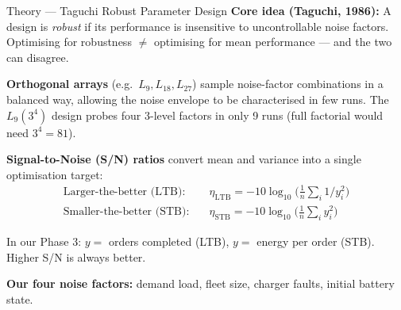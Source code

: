 \documentclass[aspectratio=169,10pt]{beamer}
\begin{document}
\begin{frame}{Theory --- Taguchi Robust Parameter Design}
  \footnotesize
  \textbf{Core idea (Taguchi, 1986):}
  A design is \emph{robust} if its performance is insensitive to uncontrollable noise factors. Optimising for robustness $\neq$ optimising for mean performance --- and the two can disagree.

  \vspace{0.4em}
  \textbf{Orthogonal arrays} (e.g.\ $L_9, L_{18}, L_{27}$) sample noise-factor combinations in a balanced way, allowing the noise envelope to be characterised in few runs. The $L_9(3^4)$ design probes four 3-level factors in only 9 runs (full factorial would need $3^4 = 81$).

  \vspace{0.4em}
  \textbf{Signal-to-Noise (S/N) ratios} convert mean and variance into a single optimisation target:
  \begin{align*}
    \text{Larger-the-better (LTB):} &\quad \eta_\text{LTB} = -10 \log_{10}\!\Big( \tfrac{1}{n} \textstyle\sum_i 1/y_i^2 \Big) \\
    \text{Smaller-the-better (STB):} &\quad \eta_\text{STB} = -10 \log_{10}\!\Big( \tfrac{1}{n} \textstyle\sum_i y_i^2 \Big)
  \end{align*}

  \vspace{0.3em}
  In our Phase 3: $y = $ orders completed (LTB), $y = $ energy per order (STB). Higher S/N is always better.

  \vspace{0.3em}
  \textbf{Our four noise factors:} demand load, fleet size, charger faults, initial battery state.
\end{frame}
\end{document}

